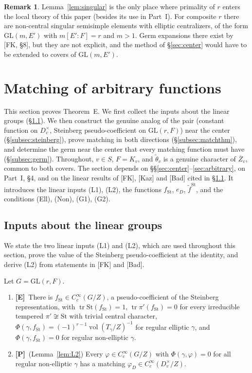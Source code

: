 \documentclass[12pt]{article}
\newcommand{\ov}[1]{\overline{#1}}
\newcommand{\tr}{\operatorname{tr}}
\newcommand{\vol}{\operatorname{vol}}
\newcommand{\GL}{\mathrm{GL}}
\newcommand{\St}{\mathrm{St}}
\newcommand{\Zb}{\ov{Z}}
\newcommand{\Pv}{\textbf{[P]}}
\newcommand{\Ev}{\textbf{[E]}}
\theoremstyle{plain}
\theoremstyle{definition}
\newtheorem{remark}[theorem]{Remark}
\begin{document}
\begin{remark}
Lemma~\ref{lem:singular} is the only place where primality of $r$ enters the local theory of this paper (besides its use in Part~I). For composite $r$ there are non-central singular semisimple elements with elliptic centralizers, of the form $\GL(m,E')$ with $m[E':F]=r$ and $m>1$. Germ expansions there exist by [FK, \S8], but they are not explicit, and the method of \S\ref{sec:center} would have to be extended to covers of $\GL(m,E')$.
\end{remark}

\section{Matching of arbitrary functions}\label{sec:matching}
This section proves Theorem~E. We first collect the inputs about the linear groups (\S\ref{subsec:linear}). We then construct the genuine analog of the pair (constant function on $D_v^\times$, Steinberg pseudo-coefficient on $\GL(r,F)$) near the center (\S\ref{subsec:steinberg}), prove matching in both directions (\S\ref{subsec:matchthm}), and determine the germ near the center that every matching function must have (\S\ref{subsec:germ}). Throughout, $v\in S$, $F=K_v$, and $\tilde\theta_v$ is a genuine character of $\Zb_v$, common to both covers. The section depends on \S\S\ref{sec:center}--\ref{sec:arbitrary}, on Part~I, \S4, and on the linear results of [FK], [Kaz] and [Bad] cited in \S\ref{subsec:linear}. It introduces the linear inputs (L1), (L2), the functions $f_{\St}$, $e_D$, $\tilde f^{\St}$, and the conditions (Ell), (Non), (G1), (G2).

\subsection{Inputs about the linear groups}\label{subsec:linear}
We state the two linear inputs (L1) and (L2), which are used throughout this section, prove the value of the Steinberg pseudo-coefficient at the identity, and derive (L2) from statements in [FK] and [Bad].

Let $G=\GL(r,F)$.
\begin{enumerate}[label=(L\arabic*)]
\item \Ev\ There is $f_{\St}\in C_c^\infty(G/Z)$, a pseudo-coefficient of the Steinberg representation, with $\tr\St(f_{\St})=1$, $\tr\pi'(f_{\St})=0$ for every irreducible tempered $\pi'\not\cong\St$ with trivial central character, $\Phi(\gamma,f_{\St})=(-1)^{r-1}\vol(T_\gamma/Z)^{-1}$ for regular elliptic $\gamma$, and $\Phi(\gamma,f_{\St})=0$ for regular non-elliptic $\gamma$.
\item \Pv\ (Lemma~\ref{lem:L2}) Every $\varphi\in C_c^\infty(G/Z)$ with $\Phi(\gamma,\varphi)=0$ for all regular non-elliptic $\gamma$ has a matching $\varphi_D\in C_c^\infty(D_v^\times/Z)$.
\end{enumerate}
\end{document}
